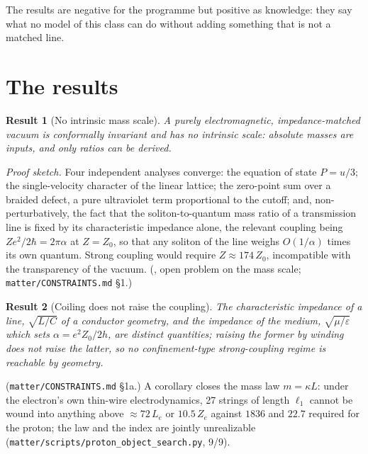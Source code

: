 \documentclass[11pt,a4paper]{article}
\newtheorem{prop}{Result}
\newcommand{\lone}{\ensuremath{\ell_1}}
\begin{document}
The results are negative for the programme but positive as knowledge: they say what no model of this class can do without adding something that is not a matched line.

\section{The results}

\begin{prop}[No intrinsic mass scale]
A purely electromagnetic, impedance-matched vacuum is conformally invariant and has no intrinsic scale: absolute masses are inputs, and only ratios can be derived.
\end{prop}
\noindent\emph{Proof sketch.} Four independent analyses converge: the equation of state $P = u/3$; the single-velocity character of the linear lattice; the zero-point sum over a braided defect, a pure ultraviolet term proportional to the cutoff; and, non-perturbatively, the fact that the soliton-to-quantum mass ratio of a transmission line is fixed by its characteristic impedance alone, the relevant coupling being $Ze^2/2\hbar = 2\pi\alpha$ at $Z = Z_0$, so that any soliton of the line weighs $O(1/\alpha)$ times its own quantum. Strong coupling would require $Z \approx 174\,Z_0$, incompatible with the transparency of the vacuum. (\cite{ds_v210}, open problem on the mass scale; \texttt{matter/CONSTRAINTS.md} \S1.)

\begin{prop}[Coiling does not raise the coupling]
The characteristic impedance of a line, $\sqrt{L/C}$ of a conductor geometry, and the impedance of the medium, $\sqrt{\mu/\varepsilon}$ which sets $\alpha = e^2 Z_0/2h$, are distinct quantities; raising the former by winding does not raise the latter, so no confinement-type strong-coupling regime is reachable by geometry.
\end{prop}
\noindent(\texttt{matter/CONSTRAINTS.md} \S1a.) A corollary closes the mass law $m = \kappa L$: under the electron's own thin-wire electrodynamics, 27 strings of length $\lone$ cannot be wound into anything above $\approx 72\,L_e$ or $10.5\,Z_e$ against $1836$ and $22.7$ required for the proton; the law and the index are jointly unrealizable (\texttt{matter/scripts/proton\_object\_search.py}, 9/9).
\end{document}

